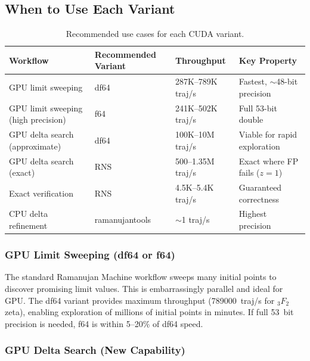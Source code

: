 \documentclass[11pt,a4paper]{article}
\begin{document}
\subsection{When to Use Each Variant}

\begin{table}[h]
\centering
\caption{Recommended use cases for each CUDA variant.}
\label{tab:recommendations}
\small
\begin{tabular}{p{3.5cm}p{4cm}p{3cm}p{3cm}}
\toprule
\textbf{Workflow} & \textbf{Recommended Variant} & \textbf{Throughput} & \textbf{Key Property} \\
\midrule
GPU limit sweeping & df64 & 287K--789K traj/s & Fastest, $\sim$48-bit precision \\
GPU limit sweeping (high precision) & f64 & 241K--502K traj/s & Full 53-bit double \\
GPU delta search (approximate) & df64 & 100K--10M traj/s & Viable for rapid exploration \\
GPU delta search (exact) & RNS & 500--1.35M traj/s & Exact where FP fails ($z=1$) \\
Exact verification & RNS & 4.5K--5.4K traj/s & Guaranteed correctness \\
CPU delta refinement & ramanujantools & $\sim$1 traj/s & Highest precision \\
\bottomrule
\end{tabular}
\end{table}

\subsubsection{GPU Limit Sweeping (df64 or f64)}

The standard Ramanujan Machine workflow sweeps many initial points to
discover promising limit values. This is embarrassingly parallel and ideal
for GPU. The df64 variant provides maximum throughput
(\SI{789000}{traj/s} for ${}_3F_2$ zeta), enabling exploration of millions
of initial points in minutes. If full \SI{53}{bit} precision is needed,
f64 is within 5--20\% of df64 speed.

\subsubsection{GPU Delta Search (New Capability)}
\end{document}
